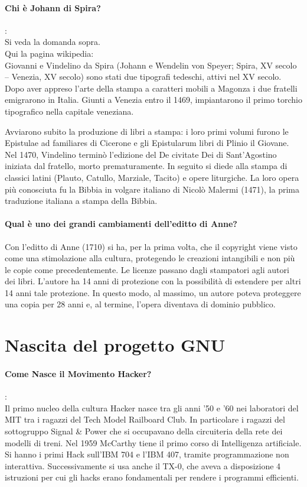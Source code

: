 \documentclass[a4paper]{article}
\begin{document}
		\paragraph{Chi è Johann di Spira?}: \\ %
		Si veda la domanda sopra.\\
		Qui la pagina wikipedia:\\
		Giovanni e Vindelino da Spira (Johann e Wendelin von Speyer; Spira, XV secolo – Venezia, XV secolo) sono stati due tipografi tedeschi, attivi nel XV secolo.
		Dopo aver appreso l'arte della stampa a caratteri mobili a Magonza i due fratelli emigrarono in Italia. Giunti a Venezia entro il 1469, impiantarono il primo torchio tipografico nella capitale veneziana.
		
		Avviarono subito la produzione di libri a stampa: i loro primi volumi furono le Epistulae ad familiares di Cicerone e gli Epistularum libri di Plinio il Giovane. Nel 1470, Vindelino terminò l'edizione del De civitate Dei di Sant'Agostino iniziata dal fratello, morto prematuramente. In seguito si diede alla stampa di classici latini (Plauto, Catullo, Marziale, Tacito) e opere liturgiche.
		La loro opera più conosciuta fu la Bibbia in volgare italiano di Nicolò Malermi (1471), la prima traduzione italiana a stampa della Bibbia.
		
		\paragraph{Qual è uno dei grandi cambiamenti dell'editto di Anne?}
		Con l'editto di Anne (1710) si ha, per la prima volta, che il copyright viene visto come una stimolazione alla cultura, protegendo le 
		creazioni intangibili e non più le copie come precedentemente. Le licenze passano dagli stampatori agli autori dei libri. L'autore ha 14 anni di protezione con la possibilità di estendere per altri 14 anni tale protezione. In questo modo, al massimo, un autore poteva proteggere una copia per 28 anni e, al termine, l'opera diventava di dominio pubblico.
	
	\section{Nascita del progetto GNU}
		\paragraph{Come Nasce il Movimento Hacker?}: \\ 
		Il primo nucleo della cultura Hacker nasce tra gli anni '50 e 
		'60 nei laboratori del MIT tra i ragazzi del Tech Model Railboard
		Club. In particolare i ragazzi del sottogruppo Signal \& Power 
		che si occupavano della circuiteria della rete dei modelli di treni.
		Nel 1959 McCarthy tiene il primo corso di Intelligenza artificiale.
		Si hanno i primi Hack sull'IBM 704 e l'IBM 407, tramite 
		programmazione non interattiva. 
		Successivamente si usa anche il TX-0, che aveva a disposizione
		4 istruzioni per cui gli hacks erano fondamentali per
		rendere i programmi efficienti. 
		
\end{document}
